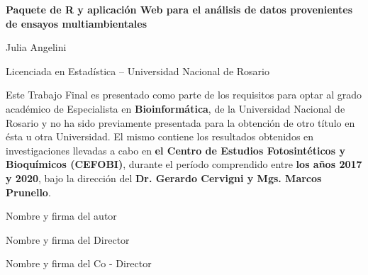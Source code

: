 
\thispagestyle{empty}
\begin{center}
\textbf{\Large{Paquete de R y aplicación Web para el análisis de datos provenientes de ensayos multiambientales}}
\end{center}

\vspace{1.5cm}

\begin{center}
Julia Angelini

\vspace{0.5cm}
Licenciada en Estadística – Universidad Nacional de Rosario
\end{center}
\vspace{1.5cm}
Este Trabajo Final es presentado como parte de los requisitos para optar al grado académico de Especialista en \textbf{Bioinformática}, de la Universidad Nacional de Rosario y no ha sido previamente presentada para la obtención de otro título en ésta u otra Universidad. El mismo contiene los resultados obtenidos en investigaciones llevadas a cabo en \textbf{el Centro de Estudios Fotosintéticos y Bioquímicos (CEFOBI)}, durante el período comprendido entre \textbf{los años 2017 y 2020}, bajo la dirección del \textbf{Dr. Gerardo Cervigni y Mgs. Marcos Prunello}.  

\vspace{1.25cm}
Nombre y firma del autor

\vspace{1.25cm}
Nombre y firma del Director
 
\vspace{1.25cm}
Nombre y firma del Co - Director

\vspace{2.5cm}



